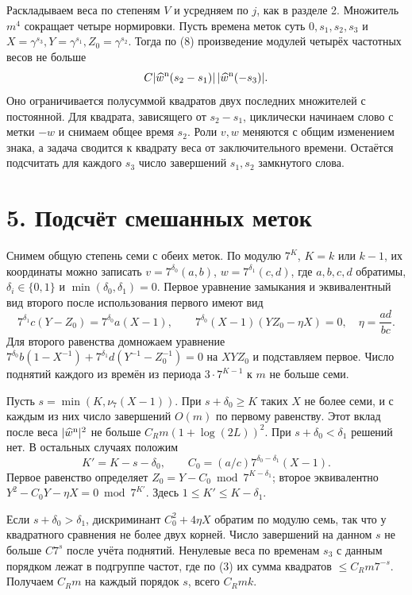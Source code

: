 \documentclass[11pt,a4paper]{article}
\newcommand{\sect}[1]{\section*{\sffamily\color{ink}#1}}
\begin{document}
Раскладываем веса по степеням \(V\) и усредняем по \(j\), как в разделе 2. Множитель \(m^4\) сокращает четыре нормировки. Пусть времена меток суть \(0,s_1,s_2,s_3\) и \(X=\gamma^{s_3},Y=\gamma^{s_1},Z_0=\gamma^{s_2}\). Тогда по (8) произведение модулей четырёх частотных весов не больше
\[
       C|\widehat w^{\rm n}(s_2-s_1)|\,|\widehat w^{\rm n}(-s_3)|.
\]
Оно ограничивается полусуммой квадратов двух последних множителей с постоянной. Для квадрата, зависящего от \(s_2-s_1\), циклически начинаем слово с метки \(-w\) и снимаем общее время \(s_2\). Роли \(v,w\) меняются с общим изменением знака, а задача сводится к квадрату веса от заключительного времени. Остаётся подсчитать для каждого \(s_3\) число завершений \(s_1,s_2\) замкнутого слова.
\newpage
\sect{5. Подсчёт смешанных меток}
Снимем общую степень семи с обеих меток. По модулю \(7^K\), \(K=k\) или \(k-1\), их координаты можно записать \(v=7^{\delta_0}(a,b)\), \(w=7^{\delta_1}(c,d)\), где \(a,b,c,d\) обратимы, \(\delta_i\in\{0,1\}\) и \(\min(\delta_0,\delta_1)=0\). Первое уравнение замыкания и эквивалентный вид второго после использования первого имеют вид
\begin{equation}
  7^{\delta_1} c(Y-Z_0)= 7^{\delta_0}a(X-1), \qquad
  7^{\delta_0}(X-1)(YZ_0-\eta X)=0,\quad \eta=\frac{ad}{bc}.
                                                               \tag{9}
\end{equation}
Для второго равенства домножаем уравнение
\(7^{\delta_0}b(1-X^{-1})+7^{\delta_1}d(Y^{-1}-Z_0^{-1})=0\)
на \(XYZ_0\) и подставляем первое. Число поднятий каждого из времён из периода \(3\cdot7^{K-1}\) к \(m\) не больше семи.

Пусть \(s=\min(K,\nu_7(X-1))\). При \(s+\delta_0\ge K\) таких \(X\) не более семи, и с каждым из них число завершений \(O(m)\) по первому равенству. Этот вклад после веса \(|\widehat w^{\rm n}|^2\) не больше \(C_R m(1+\log(2L))^2\). При \(s+\delta_0<\delta_1\) решений нет. В остальных случаях положим
\[
       K'=K-s-\delta_0,\qquad C_0=(a/c)7^{\delta_0-\delta_1}(X-1).
\]
Первое равенство определяет \(Z_0=Y-C_0\bmod7^{K-\delta_1}\); второе эквивалентно \(Y^2-C_0Y-\eta X=0\bmod7^{K'}\). Здесь \(1\le K'\le K-\delta_1\).

Если \(s+\delta_0>\delta_1\), дискриминант \(C_0^2+4\eta X\) обратим по модулю семь, так что у квадратного сравнения не более двух корней. Число завершений на данном \(s\) не больше \(C7^s\) после учёта поднятий. Ненулевые веса по временам \(s_3\) с данным порядком лежат в подгруппе частот, где по (3) их сумма квадратов \(\le C_Rm7^{-s}\). Получаем \(C_Rm\) на каждый порядок \(s\), всего \(C_Rmk\).
\end{document}
